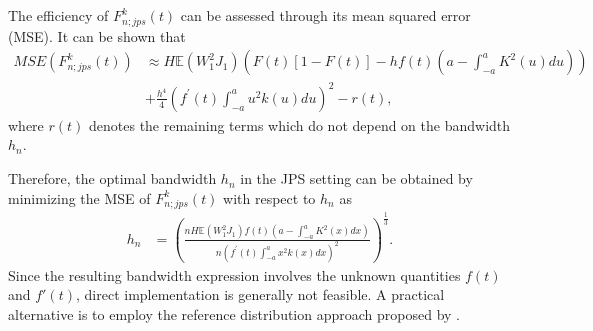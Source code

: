 \documentclass[twoside]{article}
\begin{document}
The efficiency of $F^{k}_{n;jps}(t)$ can be assessed through its mean squared error (MSE). It can be shown that
\begin{align} 
MSE \left( F^k_{n;jps}(t)\right)
&\approx H \mathbb {E}(W_1^2 J_1) \left(F(t) \left[1-F(t)\right]-hf(t)\left(a-\int_{-a}^{a} K^2(u) du \right)\right)  \nonumber \\ 
&+\frac{h^4}{4}  {\left(f^\prime (t)\int_{-a}^{a} u^2k(u)du \right)}^2  -r(t),\nonumber 
\end{align}
where
$r(t)$ denotes the remaining terms which do not depend on the bandwidth $h_n$.

Therefore, the optimal bandwidth $h_n$ in the JPS setting can be obtained by minimizing the MSE of $F^k_{n;jps}(t)$ with respect to $h_n$ as 
\begin{align*} 
h_{n}&={\left(\frac{nH\mathbb {E}(W_1^2 J_1) f(t)\left(a-\int_{-a}^{a} K^2(x) dx\right)}{n {\left( f^\prime (t)\int_{-a}^{a} x^2k(x)dx\right)}^2}\right)}^{\frac{1}{3}}.
\end{align*} 
Since the resulting bandwidth expression involves the unknown quantities $f(t)$ and $f'(t)$, direct implementation is generally not feasible. A practical alternative is to employ the reference distribution approach proposed by \cite{gulati2004smooth}.
\end{document}
